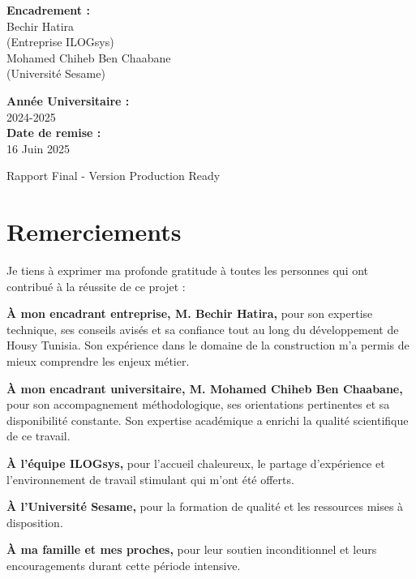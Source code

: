 \documentclass[12pt, a4paper]{report}
\newcommand{\encadrantentreprise}{Bechir Hatira}
\newcommand{\encadrantuniversite}{Mohamed Chiheb Ben Chaabane}
\newcommand{\annee}{2024-2025}
\newcommand{\dateremise}{16 Juin 2025}
\begin{document}
\begin{titlepage}
\begin{minipage}[t]{0.45\textwidth}
    \textbf{Encadrement :}\\
    \encadrantentreprise \\ (Entreprise ILOGsys)\\[0.3cm]
    \encadrantuniversite \\ (Université Sesame)
\end{minipage}
\hfill
\begin{minipage}[t]{0.45\textwidth}
    \raggedleft
    \textbf{Année Universitaire :}\\
    \annee\\[0.8cm]
    
    \textbf{Date de remise :}\\
    \dateremise
\end{minipage}

\vfill
{\large \textcolor{housygray}{Rapport Final - Version Production Ready}}
\end{titlepage}

\chapter*{Remerciements}

Je tiens à exprimer ma profonde gratitude à toutes les personnes qui ont contribué à la réussite de ce projet :

\textbf{À mon encadrant entreprise, M. Bechir Hatira,} pour son expertise technique, ses conseils avisés et sa confiance tout au long du développement de Housy Tunisia. Son expérience dans le domaine de la construction m'a permis de mieux comprendre les enjeux métier.

\textbf{À mon encadrant universitaire, M. Mohamed Chiheb Ben Chaabane,} pour son accompagnement méthodologique, ses orientations pertinentes et sa disponibilité constante. Son expertise académique a enrichi la qualité scientifique de ce travail.

\textbf{À l'équipe ILOGsys,} pour l'accueil chaleureux, le partage d'expérience et l'environnement de travail stimulant qui m'ont été offerts.

\textbf{À l'Université Sesame,} pour la formation de qualité et les ressources mises à disposition.

\textbf{À ma famille et mes proches,} pour leur soutien inconditionnel et leurs encouragements durant cette période intensive.
\end{document}

